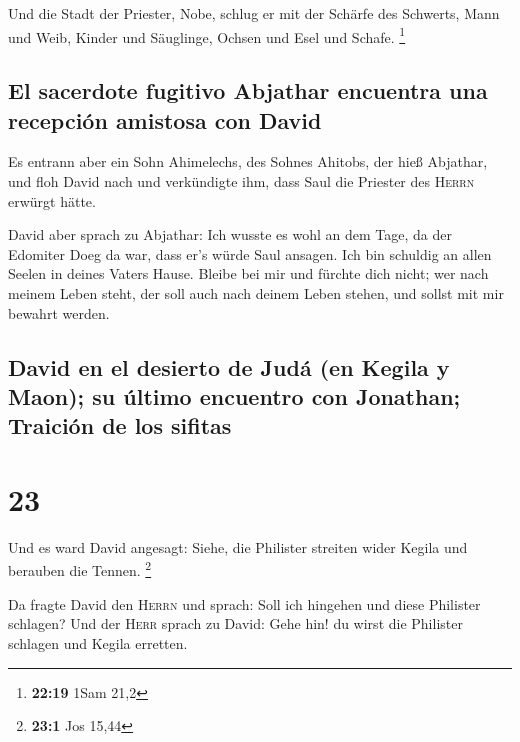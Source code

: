  Und die Stadt der Priester, Nobe, schlug er mit der
Schärfe des Schwerts, Mann und Weib, Kinder und Säuglinge, Ochsen und
Esel und Schafe. \footnote{\textbf{22:19} 1Sam 21,2}

\hypertarget{el-sacerdote-fugitivo-abjathar-encuentra-una-recepciuxf3n-amistosa-con-david}{%
\subsection{El sacerdote fugitivo Abjathar encuentra una recepción
amistosa con
David}\label{el-sacerdote-fugitivo-abjathar-encuentra-una-recepciuxf3n-amistosa-con-david}}

 Es entrann aber ein Sohn Ahimelechs, des Sohnes Ahitobs,
der hieß Abjathar, und floh David nach  und verkündigte
ihm, dass Saul die Priester des \textsc{Herrn} erwürgt hätte.

 David aber sprach zu Abjathar: Ich wusste es wohl an dem
Tage, da der Edomiter Doeg da war, dass er's würde Saul ansagen. Ich bin
schuldig an allen Seelen in deines Vaters Hause.  Bleibe
bei mir und fürchte dich nicht; wer nach meinem Leben steht, der soll
auch nach deinem Leben stehen, und sollst mit mir bewahrt werden.

\hypertarget{david-en-el-desierto-de-juduxe1-en-kegila-y-maon-su-uxfaltimo-encuentro-con-jonathan-traiciuxf3n-de-los-sifitas}{%
\subsection{David en el desierto de Judá (en Kegila y Maon); su último
encuentro con Jonathan; Traición de los
sifitas}\label{david-en-el-desierto-de-juduxe1-en-kegila-y-maon-su-uxfaltimo-encuentro-con-jonathan-traiciuxf3n-de-los-sifitas}}

\hypertarget{section-22}{%
\section{23}\label{section-22}}

 Und es ward David angesagt: Siehe, die Philister streiten
wider Kegila und berauben die Tennen. \footnote{\textbf{23:1} Jos 15,44}

 Da fragte David den \textsc{Herrn} und sprach: Soll ich
hingehen und diese Philister schlagen? Und der \textsc{Herr} sprach zu
David: Gehe hin! du wirst die Philister schlagen und Kegila erretten.

